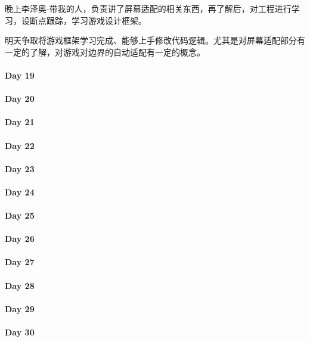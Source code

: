 \documentclass[UTF8,a4paper,8pt]{ctexart}
\begin{document}
 	 	晚上李泽奥-带我的人，负责讲了屏幕适配的相关东西，再了解后，对工程进行学习，设断点跟踪，学习游戏设计框架。
 	 	
 	 	明天争取将游戏框架学习完成、能够上手修改代码逻辑。尤其是对屏幕适配部分有一定的了解，对游戏对边界的自动适配有一定的概念。
 	 \paragraph{Day 19      \quad     }
 	 \paragraph{Day 20      \quad     }
 	 \paragraph{Day 21      \quad     }
 	 \paragraph{Day 22      \quad     }
 	 \paragraph{Day 23      \quad     }
 	 \paragraph{Day 24      \quad     }
 	 \paragraph{Day 25      \quad     }
 	 \paragraph{Day 26      \quad     }
 	 \paragraph{Day 27      \quad     }
 	 \paragraph{Day 28      \quad     }
 	 \paragraph{Day 29      \quad     }   
 	 \paragraph{Day 30      \quad     }
\end{document}
